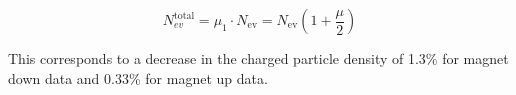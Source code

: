 \begin{equation}
	N^\mathrm{total}_{ev} = \mu_1 \cdot N_\mathrm{ev} = N_\mathrm{ev}(1 + \frac{\mu}{2})
\end{equation}

This corresponds to a decrease in the charged particle density of 1.3\% for magnet down data and 0.33\% for magnet up data.

%
%

